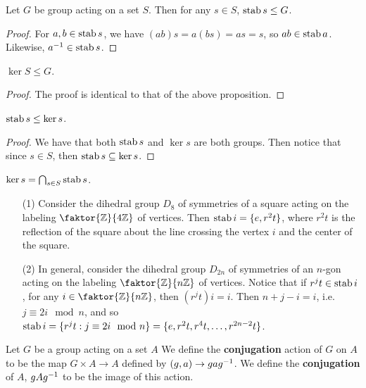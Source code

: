 \begin{proposition}\label{proposition_4.1.4}
  Let $G$ be group acting on a set  $S$. Then for any  $s \in S$,  $\operatorname{stab}{s}
  \leq G$.
\end{proposition}
\begin{proof}
  For $a,b \in \operatorname{stab}{s}$, we have $(ab)s=a(bs)=as=s$, so $ab \in \operatorname{stab}{a}$.
  Likewise, $a^{-1} \in \operatorname{stab}{s}$.
\end{proof}
\begin{corollary}
  $\ker{S} \leq G$.
\end{corollary}
\begin{proof}
  The proof is identical to that of the above proposition.
\end{proof}
\begin{corollary}
  $\operatorname{stab}{s} \leq \ker{s}$.
\end{corollary}
\begin{proof}
  We have that both $\operatorname{stab}{s}$ and $\ker{s}$ are both groups. Then notice that
  since $s \in S$, then  $\operatorname{stab}{s} \subseteq \ker{s}$.
\end{proof}
\begin{corollary}
  $\ker{s}=\bigcap_{s \in S}{\operatorname{stab}{s}}$.
\end{corollary}

\begin{example}\label{example_4.1}
  \begin{enumerate}
    \item[(1)] Consider the dihedral group $D_8$ of symmetries of a square
      acting on the labeling $\faktor{\Z}{4\Z}$ of vertices. Then
      $\operatorname{stab}{i}=\{e,r^2t\}$, where  $r^2t$ is the reflection of the square
      about the line crossing the vertex  $i$ and the center of the
      square.

    \item [(2)] In general, consider the dihedral group $D_{2n}$ of
      symmetries of an $n$-gon acting on the labeling  $\faktor{\Z}{n\Z}$
      of vertices. Notice that if  $r^jt \in \operatorname{stab}{i}$, for any $i \in
      \faktor{\Z}{n\Z}$, then $(r^jt)i=i$. Then $n+j-i=i$, i.e. $j \equiv
      2i \mod{n}$, and so $\operatorname{stab}{i}=\{r^jt : j \equiv 2i \mod{n}\}=\{e,
      r^2t, r^4t, \dots, r^{2n-2}t\}$.
  \end{enumerate}
\end{example}

\begin{definition}
  Let $G$ be a group acting on a set $A$ We define the \textbf{conjugation}
  action of $G$ on  $A$ to be the map $G \times A \rightarrow A$
  defined by $(g,a) \rightarrow gag^{-1}$. We define the \textbf{conjugation}
  of $A$, $gAg^{-1}$ to be the image of this action.
\end{definition}

